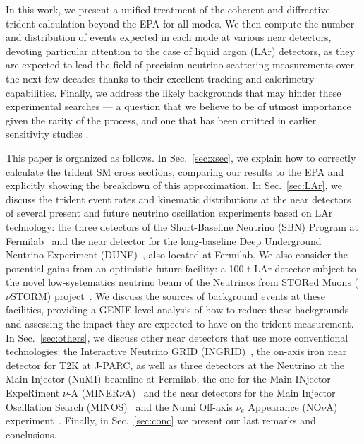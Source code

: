 In this work, we present a unified treatment of the coherent and diffractive trident calculation beyond the EPA for all modes. We then compute the number and distribution of events expected in each mode at various near detectors, devoting particular attention to the case of liquid argon (LAr) detectors, as they are expected to lead the field of precision neutrino scattering measurements over the next few decades thanks to their excellent tracking and calorimetry capabilities. Finally, we address the likely backgrounds that may hinder these experimental searches --- a question that we believe to be of utmost importance given the rarity of the process, and one that has been omitted in earlier sensitivity studies \cite{Magill:2016hgc,Altmannshofer:2014pba}. 

This paper is organized as follows. In Sec.~\ref{sec:xsec}, we explain how to correctly calculate the trident SM cross sections, comparing our results to the EPA and explicitly showing the breakdown of this approximation. In Sec.~\ref{sec:LAr}, we discuss the trident event rates and kinematic distributions at the near detectors of several present and future neutrino oscillation experiments based on LAr technology: the three detectors of the Short-Baseline Neutrino (SBN) Program at Fermilab~\cite{SBNproposal} and the near detector for the long-baseline Deep Underground Neutrino Experiment (DUNE)~\cite{Acciarri:2016ooe,DUNECDRvolII}, also located at Fermilab. We also consider the potential gains from an optimistic future facility: a 100 t LAr detector subject to the novel low-systematics neutrino beam of the Neutrinos from STORed Muons ($\nu$STORM) project~\cite{Soler:2015ada,nuSTORM2017}. 
%
We discuss the sources of background events at these facilities, providing a GENIE-level analysis \cite{Andreopoulos2009} of how to reduce these backgrounds and assessing the impact they are expected to have on the trident measurement. 
%
In Sec.~\ref{sec:others}, we discuss other near detectors that use more conventional technologies: the Interactive Neutrino GRID (INGRID)~\cite{Abe:2011xv,Abe:2015biq,Abe:2016fic,Abe:2016tez}, the on-axis iron near detector for T2K at J-PARC, as well as three detectors at the Neutrino at the Main Injector (NuMI) beamline at Fermilab, the one for the Main INjector ExpeRiment $\nu$-A (MINER$\nu$A)~\cite{Altinok:2017xua,MINERvA:2017} and the near detectors for the Main Injector Oscillation Search (MINOS)~\cite{Adamson:2014pgc,AlpernBoehm} and the Numi Off-axis $\nu_e$ Appearance (NO$\nu$A) experiment~\cite{Wang:Biao,sanchez_mayly_2018_1286758}. 
%
Finally, in Sec.~\ref{sec:conc} we  present our last remarks and conclusions.

